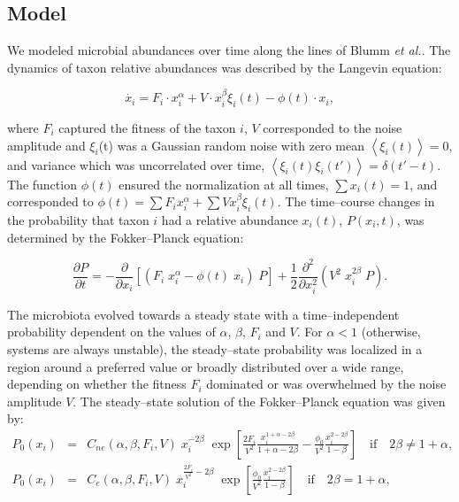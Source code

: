 \subsection*{Model} \label{sec:model}

We modeled microbial abundances over time along the lines of Blumm \textit{et al.}\cite{ranking}. The dynamics of taxon relative abundances was described by the Langevin equation:
\begin{linenomath}
\begin{equation*}
\dot{x_i} = F_i \cdot x_i^\alpha + V \cdot x_i^\beta \xi_i(t) - \phi(t) \cdot x_i,
\end{equation*}
\end{linenomath}
where $F_i$ captured the fitness of the taxon $i$, $V$ corresponded to the noise amplitude and $\xi_i$(t) was a Gaussian random noise with zero mean  $\left<\xi_i(t)\right> = 0$, and variance which was uncorrelated over time, $\left<\xi_i(t) \xi_i(t')\right> = \delta(t'-t)$. The function $\phi(t)$ ensured the normalization at all times, $\sum x_i(t) = 1$, and corresponded to $\phi(t) = \sum F_i x_i^\alpha + \sum V x_i^\beta \xi_i(t)$.
The time--course changes in the probability that taxon $i$ had a relative abundance $x_i(t)$, $P(x_i,t)$, was determined by the Fokker--Planck equation:
\begin{linenomath}
\begin{equation*}
\frac{\partial P}{\partial t} = - \frac{\partial}{\partial x_i}  \left[(F_i \; x_i^\alpha - \phi(t) \; x_i ) \; P\right]+ \frac{1}{2} \frac{\partial^2}{\partial x_i^2} \left(V^2 \; x_i^{2\beta}\; P\right).
\end{equation*}
\end{linenomath}
The microbiota evolved towards a steady state with a time--independent probability dependent on the values of $\alpha$, $\beta$, $F_i$ and $V$. For $\alpha<1$ (otherwise, systems are always unstable), the steady--state probability was localized in a region around a preferred value or broadly distributed over a wide range, depending on whether the fitness $F_i$ dominated or was overwhelmed by the noise amplitude $V$. The steady--state solution of the Fokker--Planck equation was given by:
\begin{eqnarray*}
P_0 (x_i) &=& C_{ne}(\alpha,\beta,F_i,V)  \; x_i^{-2\beta}  \; \exp\left[\frac{2F_i}{V^2}\frac{x_i^{1+\alpha-2\beta}}{1+\alpha-2\beta}-\frac{\phi_0}{V^2}\frac{x_i^{2-2\beta}}{1-\beta}\right] \quad \textrm{if} \quad  2\beta \ne 1+\alpha, \\
P_0 (x_i) &=& C_e(\alpha,\beta,F_i,V)  \; x_i^{\frac{2F_i}{V^2} -2\beta}  \; \exp\left[\frac{\phi_0}{V^2}\frac{x_i^{2-2\beta}}{1-\beta}\right] \quad \textrm{if} \quad  2\beta = 1+\alpha,
\end{eqnarray*}
